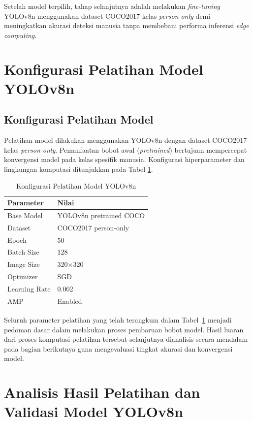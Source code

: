 Setelah model terpilih, tahap selanjutnya adalah melakukan \textit{fine-tuning} YOLOv8n menggunakan dataset COCO2017 kelas \textit{person-only} demi meningkatkan akurasi deteksi manusia tanpa membebani performa inferensi \textit{edge computing}.

\section{Konfigurasi Pelatihan Model YOLOv8n}

\subsection{Konfigurasi Pelatihan Model}

Pelatihan model dilakukan menggunakan YOLOv8n dengan dataset COCO2017 kelas \textit{person-only}. Pemanfaatan bobot awal (\textit{pretrained}) bertujuan mempercepat konvergensi model pada kelas spesifik manusia. Konfigurasi hiperparameter dan lingkungan komputasi ditunjukkan pada Tabel \ref{tab:training_config}.

\begin{table}[H]
	\centering
	\caption{Konfigurasi Pelatihan Model YOLOv8n}
	\label{tab:training_config}
	\renewcommand{\arraystretch}{1.1}
	\begin{tabular}{|l|l|}
		\hline
		Parameter & Nilai \\ \hline
		Base Model & YOLOv8n pretrained COCO \\ \hline
		Dataset & COCO2017 person-only \\ \hline
		Epoch & 50 \\ \hline
		Batch Size & 128 \\ \hline
		Image Size & 320$\times$320 \\ \hline
		Optimizer & SGD \\ \hline
		Learning Rate & 0.002 \\ \hline
		AMP & Enabled \\ \hline
	\end{tabular}
\end{table}

Seluruh parameter pelatihan yang telah terangkum dalam Tabel~\ref{tab:training_config} menjadi pedoman dasar dalam melakukan proses pembaruan bobot model. Hasil luaran dari proses komputasi pelatihan tersebut selanjutnya dianalisis secara mendalam pada bagian berikutnya guna mengevaluasi tingkat akurasi dan konvergensi model.

\section{Analisis Hasil Pelatihan dan Validasi Model YOLOv8n}

